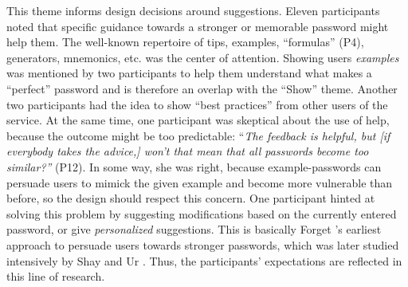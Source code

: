 This theme informs design decisions around suggestions. Eleven participants noted that specific guidance towards a stronger or memorable password might help them. The well-known repertoire of tips, examples, ``formulas'' (P4), generators, mnemonics, etc. was the center of attention. Showing users \textit{examples} was mentioned by two participants to help them understand what makes a ``perfect'' password and is therefore an overlap with the ``Show'' theme. Another two participants had the idea to show ``best practices'' from other users of the service. At the same time, one participant was skeptical about the use of help, because the outcome might be too predictable: ``\textit{The feedback is helpful, but [if everybody takes the advice,] won't that mean that all passwords become too similar?''} (P12). In some way, she was right, because example-passwords can persuade users to mimick the given example and become more vulnerable than before, so the design should respect this concern. One participant hinted at solving this problem by suggesting modifications based on the currently entered password, or give \textit{personalized} suggestions. This is basically Forget \etal's earliest approach to persuade users towards stronger passwords, which was later studied intensively by Shay \etal \cite{Shay2015SpoonfulOfSugar} and Ur \etal \cite{Ur2017DataDrivenPWMeter}. Thus, the participants' expectations are reflected in this line of research.





